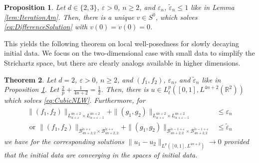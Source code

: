 \documentclass{amsart}
\newtheorem{theorem}{Theorem}[section]
\newtheorem{proposition}[theorem]{Proposition}
\theoremstyle{definition}
\newcommand{\R}{\mathbb{R}}
\numberwithin{equation}{section}
\begin{document}
{\begin{proposition}
\label{prop:ExistenceDifferenceSolution}
Let $d \in \{2,3\}$, $\varepsilon > 0$, $n \geq 2$, and $\varepsilon_n$, $\tilde{\varepsilon}_n \leq 1$ like in Lemma \ref{lem:IterationAm}. Then, there is a unique $v \in S^0$, which solves \eqref{eq:DifferenceSolution} with $v(0) = \dot{v}(0) = 0$.
\end{proposition}
This yields the following theorem on local well-posedness for slowly decaying initial data. We focus on the two-dimensional case with small data to simplify the Strichartz space, but there are clearly analogs available in higher dimensions.
\begin{theorem}
\label{thm:SlowlyDecayingData}
Let $d=2$, $\varepsilon > 0$, $n \geq 2$, and $(f_1,f_2)$, $\varepsilon_n$, and $\tilde{\varepsilon}_n$ like in Proposition \ref{prop:ExistenceDifferenceSolution}. Let $\frac{2}{p} + \frac{1}{4n+2} = \frac{1}{2}$. Then, there is $u \in L_t^p([0,1],L^{4n+2}(\R^2))$ which solves \eqref{eq:CubicNLW}. Furthermore, for 
\begin{align*}
\| (f_1,f_2) \|_{L^{4n+2}_{\alpha+\varepsilon} \times L^{4n+2}_{\alpha + \varepsilon -1}} + \| (g_1,g_2) \|_{L^{4n+2}_{\alpha+\varepsilon} \times L^{4n+2}_{\alpha + \varepsilon -1}} &\leq \varepsilon_n \\
\text{ or } 
\| (f_1,f_2) \|_{\mathcal{B}^{\tilde{\alpha}+\varepsilon}_{4n+2,2} \times \mathcal{B}^{\tilde{\alpha}+\varepsilon}_{4n+2,2}} + \| (g_1,g_2) \|_{\mathcal{B}^{\tilde{\alpha}-1+\varepsilon}_{4n+2,2} \times \mathcal{B}^{\tilde{\alpha}-1+\varepsilon}_{4n+2,2}} &\leq \tilde{\varepsilon}_n
\end{align*}
we have for the corresponding solutions $\| u_1 - u_2 \|_{L^p([0,1],L^{4n+2})} \to 0$ provided that the initial data are converging in the spaces of initial data.
\end{theorem}
}
\end{document}
